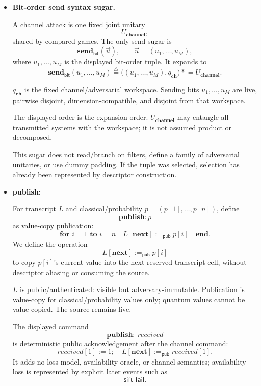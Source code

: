 \documentclass[acmsmall,screen,review,anonymous,nonacm]{acmart}
\theoremstyle{defn_style}
\newcommand{\asteq}{\mathrel{*}=}
\begin{document}
\begin{itemize}
    \item {\textbf{Bit-order send syntax sugar.}}
    
    {A channel attack is one fixed joint unitary}
    \[
    {
    U_{\textbf{channel}},
    }
    \]
    {shared by compared games. The only send sugar is}
    \[
    {
    \mathbf{send}_{\mathsf{bit}}(\vec u),
    \qquad
    \vec u=(u_1,\ldots,u_M),
    }
    \]
    {where \(u_1,\ldots,u_M\) is the displayed bit-order tuple.
    It expands to}
    \[
    {
    \mathbf{send}_{\mathsf{bit}}(u_1,\ldots,u_M)
    \stackrel{\triangle}{=}
    \bigl((u_1,\ldots,u_M),\bar q_{\mathbf{ch}}\bigr)
    \asteq
    U_{\textbf{channel}} .
    }
    \]
    
    {\(\bar q_{\mathbf{ch}}\) is the fixed channel/adversarial
    workspace. Sending bits \(u_1,\ldots,u_M\) are live, pairwise disjoint,
    dimension-compatible, and disjoint from that workspace.}
    
    {The displayed order is the expansion order.
    \(U_{\textbf{channel}}\) may entangle all transmitted systems with the
    workspace; it is not assumed product or decomposed.}
    
    {This sugar does not read/branch on filters, define a family
    of adversarial unitaries, or use dummy padding. If the tuple was selected,
    selection has already been represented by descriptor construction.}
    
    \item \textbf{publish:}

    For transcript \(L\) and classical/probability
    \(p=(p[1],\ldots,p[n])\), define
    \[
    \mathbf{publish: }p
    \]
    as value-copy publication:
    \[
    \textbf{for } i=1 \textbf{ to } i=n
    \quad
    L[\mathbf{next}] :=_{\mathsf{pub}} p[i]
    \quad
    \textbf{end}.
    \]
    We define the operation
    \[
    L[\mathbf{next}] :=_{\mathsf{pub}} p[i]
    \]
    to copy \(p[i]\)'s current value into the next reserved transcript cell,
    without descriptor aliasing or consuming the source.

    \(L\) is public/authenticated: visible but adversary-immutable.
    Publication is value-copy for classical/probability values only; quantum
    values cannot be value-copied. The source remains live.

    The displayed command
    \[
    \mathbf{publish:}~received
    \]
    is deterministic public acknowledgement after the channel command:
    \[
    received[1] := 1;\quad
    L[\mathbf{next}] :=_{\mathsf{pub}} received[1].
    \]
    It adds no loss model, availability oracle, or channel semantics;
    availability loss is represented by explicit later events such as
    \[
    \mathsf{sift\mbox{-}fail}.
    \]
\end{itemize}
\end{document}
